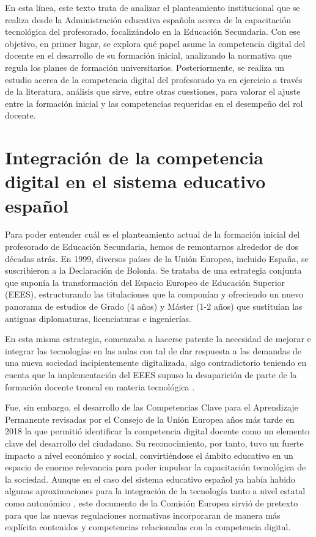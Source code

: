 \documentclass[spanish]{textolivre}
\begin{document}
En esta línea, este texto trata de analizar el planteamiento institucional que se realiza desde la Administración educativa española acerca de la capacitación tecnológica del profesorado, focalizándolo en la Educación Secundaria. Con ese objetivo, en primer lugar, se explora qué papel asume la competencia digital del docente en el desarrollo de su formación inicial, analizando la normativa que regula los planes de formación universitarios. Posteriormente, se realiza un estudio acerca de la competencia digital del profesorado ya en ejercicio a través de la literatura, análisis que sirve, entre otras cuestiones, para valorar el ajuste entre la formación inicial y las competencias requeridas en el desempeño del rol docente.


\section{Integración de la competencia digital en el sistema educativo español}

Para poder entender cuál es el planteamiento actual de la formación inicial del profesorado de Educación Secundaria, hemos de remontarnos alrededor de dos décadas atrás. En 1999, diversos países de la Unión Europea, incluido España, se suscribieron a la Declaración de Bolonia. Se trataba de una estrategia conjunta que suponía la transformación del Espacio Europeo de Educación Superior (EEES), estructurando las titulaciones que la componían y ofreciendo un nuevo panorama de estudios de Grado (4 años) y Máster (1-2 años) que sustituían las antiguas diplomaturas, licenciaturas e ingenierías.

En esta misma estrategia, comenzaba a hacerse patente la necesidad de mejorar e integrar las tecnologías en las aulas con tal de dar respuesta a las demandas de una nueva sociedad incipientemente digitalizada, algo contradictorio teniendo en cuenta que la implementación del EEES supuso la desaparición de parte de la formación docente troncal en materia tecnológica \cite{herrada_valverde_adaptacion_2011}.

Fue, sin embargo, el desarrollo de las Competencias Clave para el Aprendizaje Permanente \cite{comision2006} revisadas por el Consejo de la Unión Europea años más tarde en 2018 la que permitió identificar la competencia digital docente como un elemento clave del desarrollo del ciudadano. Su reconocimiento, por tanto, tuvo un fuerte impacto a nivel económico y social, convirtiéndose el ámbito educativo en un espacio de enorme relevancia para poder impulsar la capacitación tecnológica de la sociedad. Aunque en el caso del sistema educativo español ya había habido algunas aproximaciones para la integración de la tecnología tanto a nivel estatal \cite{colas-bravo_impact_2018} como autonómico \cite{paredes2013politicas}, este documento de la Comisión Europea sirvió de pretexto para que las nuevas regulaciones normativas incorporaran de manera más explícita contenidos y competencias relacionadas con la competencia digital.
\end{document}
